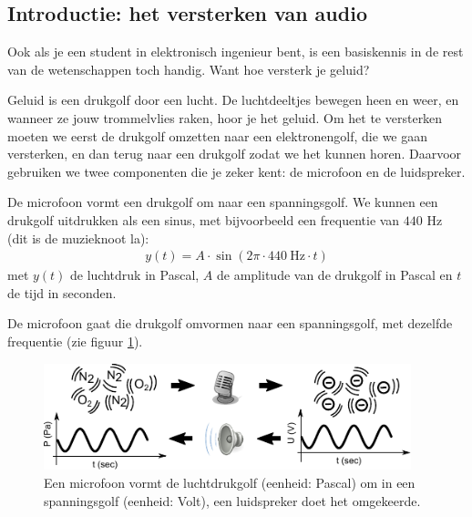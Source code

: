 \documentclass{article}
\begin{document}
		\subsection{Introductie: het versterken van audio}

			Ook als je een student in elektronisch ingenieur bent, is een basiskennis in de rest van de wetenschappen toch handig. Want hoe versterk je geluid?

			Geluid is een drukgolf door een lucht. De luchtdeeltjes bewegen heen en weer, en wanneer ze jouw trommelvlies raken, hoor je het geluid. Om het te versterken moeten we eerst de drukgolf omzetten naar een elektronengolf, die we gaan versterken, en dan terug naar een drukgolf zodat we het kunnen horen. Daarvoor gebruiken we twee componenten die je zeker kent: de microfoon en de luidspreker.



			De microfoon vormt een drukgolf om naar een spanningsgolf. We kunnen een drukgolf uitdrukken als een sinus, met bijvoorbeeld een frequentie van $440$ Hz (dit is de muzieknoot la):
			\begin{align}
				y(t) = A \cdot \sin (2\pi \cdot 440~\text{Hz} \cdot t)
			\end{align}
			met $y(t)$ de luchtdruk in Pascal, $A$ de amplitude van de drukgolf in Pascal en $t$ de tijd in seconden.

			De microfoon gaat die drukgolf omvormen naar een spanningsgolf, met dezelfde frequentie (zie figuur \ref{fig:micro}).
			\begin{figure}[htbp]
				\centering
				\includegraphics[width=0.95\textwidth]{micro}
				\caption{Een microfoon vormt de luchtdrukgolf (eenheid: Pascal) om in een spanningsgolf (eenheid: Volt), een luidspreker doet het omgekeerde.}
				\label{fig:micro}
			\end{figure}
\end{document}
